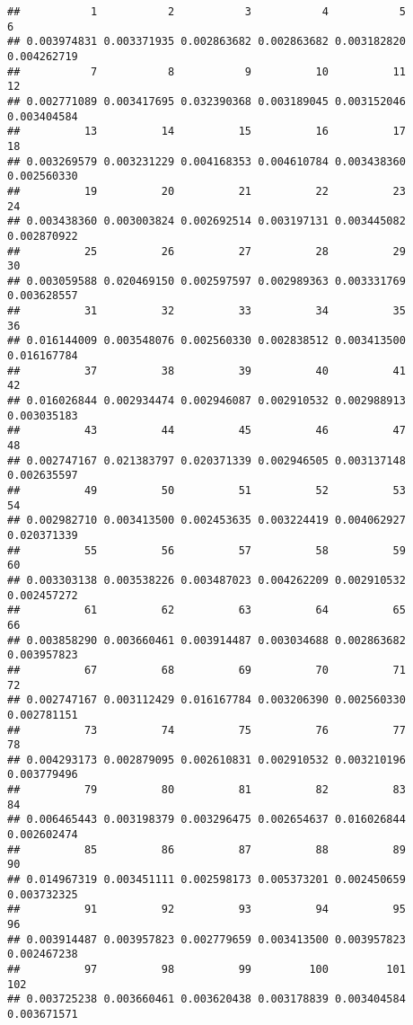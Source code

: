 \documentclass[
]{article}
\begin{document}
\begin{verbatim}
##           1           2           3           4           5           6 
## 0.003974831 0.003371935 0.002863682 0.002863682 0.003182820 0.004262719 
##           7           8           9          10          11          12 
## 0.002771089 0.003417695 0.032390368 0.003189045 0.003152046 0.003404584 
##          13          14          15          16          17          18 
## 0.003269579 0.003231229 0.004168353 0.004610784 0.003438360 0.002560330 
##          19          20          21          22          23          24 
## 0.003438360 0.003003824 0.002692514 0.003197131 0.003445082 0.002870922 
##          25          26          27          28          29          30 
## 0.003059588 0.020469150 0.002597597 0.002989363 0.003331769 0.003628557 
##          31          32          33          34          35          36 
## 0.016144009 0.003548076 0.002560330 0.002838512 0.003413500 0.016167784 
##          37          38          39          40          41          42 
## 0.016026844 0.002934474 0.002946087 0.002910532 0.002988913 0.003035183 
##          43          44          45          46          47          48 
## 0.002747167 0.021383797 0.020371339 0.002946505 0.003137148 0.002635597 
##          49          50          51          52          53          54 
## 0.002982710 0.003413500 0.002453635 0.003224419 0.004062927 0.020371339 
##          55          56          57          58          59          60 
## 0.003303138 0.003538226 0.003487023 0.004262209 0.002910532 0.002457272 
##          61          62          63          64          65          66 
## 0.003858290 0.003660461 0.003914487 0.003034688 0.002863682 0.003957823 
##          67          68          69          70          71          72 
## 0.002747167 0.003112429 0.016167784 0.003206390 0.002560330 0.002781151 
##          73          74          75          76          77          78 
## 0.004293173 0.002879095 0.002610831 0.002910532 0.003210196 0.003779496 
##          79          80          81          82          83          84 
## 0.006465443 0.003198379 0.003296475 0.002654637 0.016026844 0.002602474 
##          85          86          87          88          89          90 
## 0.014967319 0.003451111 0.002598173 0.005373201 0.002450659 0.003732325 
##          91          92          93          94          95          96 
## 0.003914487 0.003957823 0.002779659 0.003413500 0.003957823 0.002467238 
##          97          98          99         100         101         102 
## 0.003725238 0.003660461 0.003620438 0.003178839 0.003404584 0.003671571 

\end{verbatim}
\end{document}
